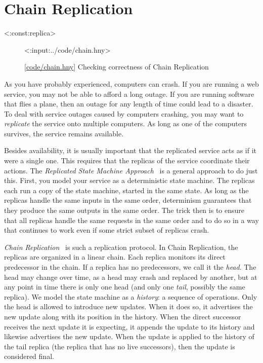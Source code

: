 \documentclass{report}
\newcommand{\harmonylink}[1]{%
[\href{https://harmony.cs.cornell.edu/#1}{\underline{#1}}]%
}
\newenvironment{code}{
\tcolorbox
}{
\endtcolorbox
}
\begin{document}
{\chapter{Chain Replication}
\label{ch:chain}

<{:const:replica}>

\begin{figure}
\begin{code}
<{:input:../code/chain.hny}>
\end{code}
\caption{\harmonylink{code/chain.hny} Checking correctness of Chain Replication}
\label{fig:chain}
\end{figure}

%
%
As you have probably experienced, computers can crash.
If you are running a web service, you may not be able to afford
a long outage.  If you are running software that flies a plane,
then an outage for any length of time could lead to a disaster.
To deal with service outages caused by computers crashing, you may want
to \emph{replicate} the service onto multiple computers.  As long as
one of the computers survives, the service remains available.

%
%
%
Besides availability, it is usually important that the replicated
service acts as if it were a single one.  This requires that the
replicas of the service coordinate their actions.
The \emph{Replicated State Machine Approach}~\cite{Lam78,S90} is a
general approach to do just this.
First, you model your service as a deterministic state
machine.  The replicas each run a copy of the state machine, started
in the same state.  As long as the replicas handle the same inputs
in the same order, determinism guarantees that they produce the same
outputs in the same order.
The trick then is to ensure that all replicas handle the
same requests in the same order and to do so in a way that continues
to work even if some strict subset of replicas crash.

\emph{Chain Replication}~\cite{vRS04} is such a replication protocol.
In Chain Replication, the replicas are organized in a linear chain.
Each replica monitors its direct predecessor in the chain.  If a replica has
no predecessors, we call it the \emph{head}.  The head may change over
time, as a head may crash and replaced by another, but at any point in
time there is only one head
(and only one \emph{tail}, possibly the same replica).
We model the state machine as a \emph{history}: a sequence of operations.
Only the head is allowed to introduce new updates.
When it does so, it advertises the new update along with its position
in the history.  When the direct successor receives the next update
it is expecting, it appends the update to its history and likewise
advertises the new update.  When the update is applied to the history
of the tail replica (the replica that has no live successors),
then the update is considered final.

}
\end{document}
